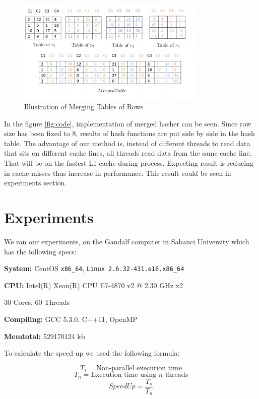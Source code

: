 \documentclass[twoside]{article}
\begin{document}
\begin{figure}[H]
	\centering
	\includegraphics[width=0.8\textwidth]{illustration.png}
	\caption{Illustration of Merging Tables of Rows}
	
	
\end{figure}

\par 
In the figure \ref{fig:code}, implementation of merged hasher can be seen. Since row size has been fixed to 8, results of hash functions are put side by side in the hash table.
The advantage of our method is, instead of different threads to read data that sits on different cache lines, all threads read data from the same cache line. That will be on the fastest L1 cache during process. Expecting result is reducing in cache-misses thus increase in performance.
This result could be seen in experiments section.


\section{Experiments}

We ran our experiments, on the Gandalf computer in Sabanci University which has the following specs:

\begin{framed}
	\textbf{System:} CentOS \texttt{x86\_64}, \texttt{Linux 2.6.32-431.e16.x86\_64} \par
	\textbf{CPU:} Intel(R) Xeon(R) CPU E7-4870 v2 @ 2.30 GHz x2 \par
				  30 Cores, 60 Threads \par
	\textbf{Compiling:} GCC 5.3.0, C++11, OpenMP \par
	\textbf{Memtotal:} 529170124 kb \par
\end{framed}

To calculate the speed-up we used the following formula:

\par $$T_{s} =\text{Non-parallel execution time}$$
$$T_{n} = \text{Execution time using $n$ threads} $$
$$SpeedUp = \frac{T_{s}}{T_{n}}$$
\end{document}
